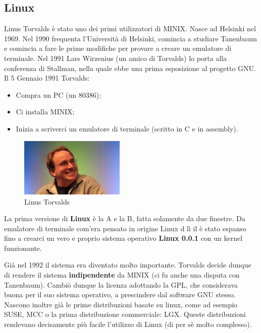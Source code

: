 \subsection{Linux}

Linus Torvalds è stato uno dei primi utilizzatori di MINIX. Nasce ad Helsinki nel 1969. Nel 1990 frequenta l'Università di Helsinki, comincia a studiare Tanenbaum e comincia a fare le prime modifiche per provare a creare un emulatore di terminale. Nel 1991 Lars Wirzenius (un amico di Torvalds) lo porta alla conferenza di Stallman, nella quale ebbe una prima esposizione al progetto GNU. Il 5 Gennaio 1991 Torvalds:

\begin{itemize}

\item Compra un PC (un 80386);
\item Ci installa MINIX;
\item Inizia a scriverci un emulatore di terminale (scritto in C e in assembly).

\end{itemize}

\begin{figure}[htbp]
\centering
\includegraphics[width=50mm]{images/linus-torvalds.jpg}
\caption{Linus Torvalds}
\end{figure}

La prima versione di \textbf{Linux} è la A e la B, fatta solamente da due finestre. Da emulatore di terminale com'era pensato in origine Linux d lì il è stato espanso fino a crearci un vero e proprio sistema operativo \textbf{Linux 0.0.1} con un kernel funzionante.

Già nel 1992 il sistema era diventato molto importante. Torvalds decide dunque di rendere il sistema \textbf{indipendente} da MINIX (ci fu anche una disputa con Tanenbaum). Cambiò dunque la licenza adottando la GPL, che considerava buona per il suo sistema operativo, a prescindere dal software GNU stesso. Nascono inoltre già le prime distribuzioni basate su linux, come ad esempio SUSE, MCC o la prima distribuzione commerciale: LGX. Queste distribuzioni rendevano decisamente più facile l'utilizzo di Linux (di per sè molto complesso).

